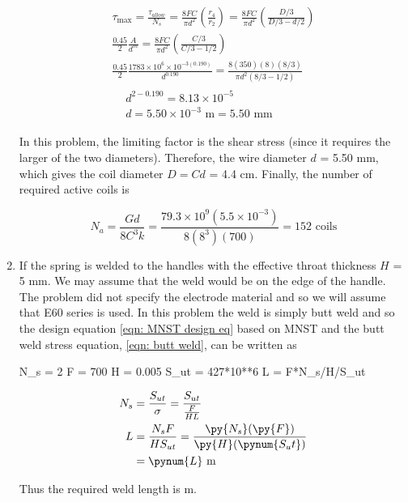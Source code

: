 \documentclass[
10pt,
a4paper,
openany,
svgnames,
]{book}
\begin{document}
\begin{enumerate}
  \begin{gather*}
    \tau_{\max} = \frac{\tau_{allow}}{N_s} = \frac{8FC}{\pi d^2}\left( \frac{r_4}{r_2} \right) = \frac{8FC}{\pi d^2}\left( \frac{D/3}{D/3 - d/2} \right) \\ 
    \frac{0.45}{2}\frac{A}{d^m} = \frac{8FC}{\pi d^2}\left( \frac{C/3}{C/3 - 1/2} \right) \\ 
    \frac{0.45}{2}\frac{1783 \times 10^6 \times 10^{-3(0.190)}}{d^{0.190}} = \frac{8(350)(8)(8/3)}{\pi d^2(8/3 - 1/2)} \\
    \begin{aligned}
      &d^{2-0.190} = 8.13 \times 10^{-5} \\ 
      &d = 5.50 \times 10^{-3}\text{ m} = 5.50 \text{ mm}
    \end{aligned}
  \end{gather*}

  In this problem, the limiting factor is the shear stress (since it requires the larger of the two diameters). Therefore, the wire diameter $d$ = 5.50 mm, which gives the coil diameter $D = Cd$ = 4.4 cm. Finally, the number of required active coils is

  \[N_a = \frac{Gd}{8C^3k} = \frac{79.3 \times 10^9(5.5 \times 10^{-3})}{8(8^3)(700)} = 152\text{ coils}\]

\item If the spring is welded to the handles with the effective throat thickness $H$ = 5 mm. We may assume that the weld would be on the edge of the handle. The problem did not specify the electrode material and so we will assume that E60 series is used. In this problem the weld is simply butt weld and so the design equation \cref{eqn: MNST design eq} based on MNST and the butt weld stress equation, \cref{eqn: butt weld}, can be written as 

  \begin{pycode}
    N_s = 2
    F = 700
    H = 0.005
    S_ut = 427*10**6
    L = F*N_s/H/S_ut
  \end{pycode}

  \begin{align*}
    N_s &= \frac{S_{ut}}{\sigma} = \frac{S_{ut}}{\frac{F}{HL}} \\
    L &= \frac{N_s F}{H S_{ut}} = \frac{\py{N_s}(\py{F})}{\py{H}(\pynum{S_ut})} \\
        &= \pynum{L} \text{ m}
  \end{align*}

  Thus the required weld length is  m.


\end{enumerate}
\end{document}
